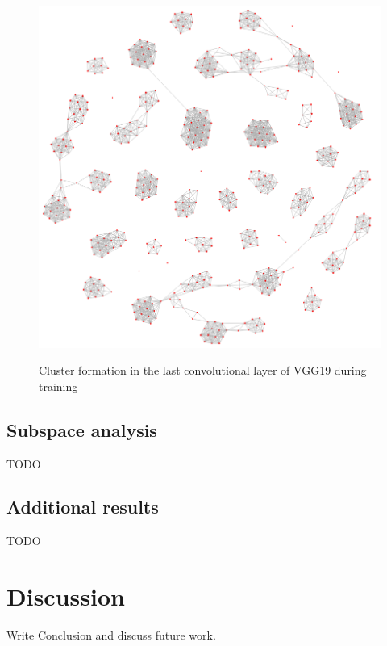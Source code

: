 \begin{figure}[H]
\centering
	\includegraphics[scale=0.3]{images/vgg-conv16-final.png}
    \label{fig:vgg-conv16-final} 
\caption{Cluster formation in the last convolutional layer of VGG19 during training}
\end{figure}

\subsection{Subspace analysis}
TODO

\subsection{Additional results}
TODO

\section{Discussion}

Write Conclusion and discuss future work.


\nocite{*}
\printbibliography


